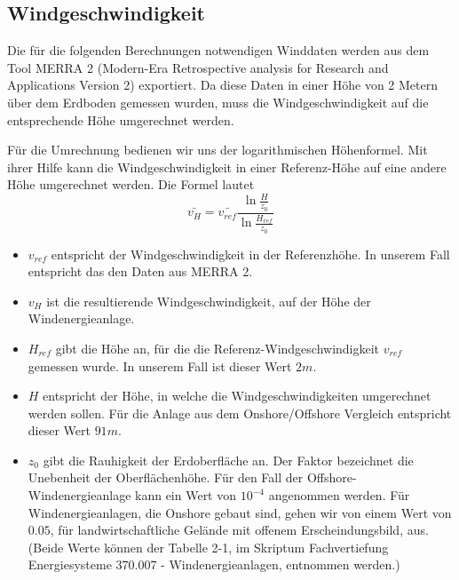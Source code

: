 \documentclass[a4paper,12pt]{article}
\begin{document}
	\subsection{Windgeschwindigkeit}
	Die für die folgenden Berechnungen notwendigen Winddaten werden aus dem Tool MERRA 2 (Modern-Era Retrospective analysis for Research and Applications Version 2) exportiert. Da diese Daten in einer Höhe von 2 Metern über dem Erdboden gemessen wurden, muss die Windgeschwindigkeit auf die entsprechende Höhe umgerechnet werden.\\ \par
	\noindent Für die Umrechnung bedienen wir uns der logarithmischen Höhenformel. Mit ihrer Hilfe kann die Windgeschwindigkeit in einer Referenz-Höhe auf eine andere Höhe umgerechnet werden.
	\newline Die Formel lautet
	\begin{equation}
	\bar{v_H} = \bar{v_{ref}}\frac{\ln{\frac{H}{z_0}}}{\ln{\frac{H_{ref}}{z_0}}}
	\end{equation}
	\begin{itemize}
		\item $v_{ref}$ entspricht der Windgeschwindigkeit in der Referenzhöhe. In unserem Fall entspricht das den Daten aus MERRA 2.
		\item $v_H$ ist die resultierende Windgeschwindigkeit, auf der Höhe der Windenergieanlage.
		\item $H_{ref}$ gibt die Höhe an, für die die Referenz-Windgeschwindigkeit $v_{ref}$ gemessen wurde. In unserem Fall ist dieser Wert $2m$.
		\item $H$ entspricht der Höhe, in welche die Windgeschwindigkeiten umgerechnet werden sollen. Für die Anlage aus dem Onshore/Offshore Vergleich entspricht dieser Wert $91m$.
		\item $z_0$ gibt die Rauhigkeit der Erdoberfläche an. Der Faktor bezeichnet die Unebenheit der Oberflächenhöhe. Für den Fall der Offshore-Windenergieanlage kann ein Wert von $10^{-4}$ angenommen werden. Für Windenergieanlagen, die Onshore gebaut sind, gehen wir von einem Wert von $0.05$, für landwirtschaftliche Gelände mit offenem Erscheindungsbild, aus. (Beide Werte können der Tabelle 2-1, im Skriptum Fachvertiefung Energiesysteme 370.007 -  Windenergieanlagen, entnommen werden.)
	\end{itemize}
\end{document}
